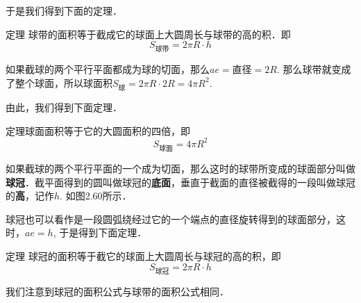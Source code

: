 于是我们得到下面的定理．

\begin{blk}
    {定理} 球带的面积等于截成它的球面上大圆周长与球带的高的积．即
\[S_{\text{球带}}=2\pi R\cdot h\]
\end{blk}

如果截球的两个平行平面都成为球的切面，那么$ae=$直径$=2R$. 那么球带就变成了整个球面，所以球面积$S_{\text{球}}=2\pi R\cdot 2R=4\pi R^2$.

由此，我们得到下面定理．

\begin{blk}
    {定理}球面面积等于它的大圆面积的四倍，即
\[S_{\text{球面}}=4\pi R^2\]
\end{blk}

如果截球的两个平行平面的一个成为切面，那么这时的球带所变成的球面部分叫做\textbf{球冠}．截平面得到的圆叫做球冠的\textbf{底面}，垂直于截面的直径被截得的一段叫做球冠的\textbf{高}，记作$h$. 如图2.60所示．

球冠也可以看作是一段圆弧绕经过它的一个端点的直径旋转得到的球面部分，这时，$ae=h$, 于是得到下面定理．


\begin{blk}
    {定理} 球冠的面积等于截它的球面上大圆周长与球冠的高的积，即
\[S_{\text{球冠}}=2\pi R\cdot h\]
\end{blk}

我们注意到球冠的面积公式与球带的面积公式相同．

